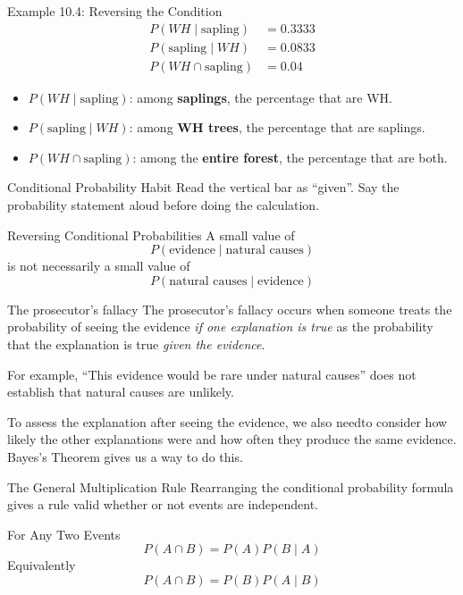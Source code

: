 \documentclass[aspectratio=169]{beamer}
\begin{document}
\begin{frame}{Example 10.4: Reversing the Condition}
\begin{align*}
	P(WH\mid\text{sapling}) &= 0.3333\\
	P(\text{sapling}\mid WH) &= 0.0833\\
	P(WH\cap\text{sapling}) &= 0.04
\end{align*}
\begin{itemize}
	\item $P(WH\mid\text{sapling})$: among \textbf{saplings}, the percentage that are WH.
	\item $P(\text{sapling}\mid WH)$: among \textbf{WH trees}, the percentage that are saplings.
    	\item $P(WH\cap\text{sapling})$: among the \textbf{entire forest}, the percentage that are both.
\end{itemize}
\begin{block}{Conditional Probability Habit}
Read the vertical bar as ``given''. Say the probability statement aloud before doing the calculation.
\end{block}
\end{frame}

\begin{frame}{Reversing Conditional Probabilities}
A small value of
\[
P(\text{evidence}\mid\text{natural causes})
\]
is not necessarily a small value of
\[
P(\text{natural causes}\mid\text{evidence})
\]

\begin{alertblock}{The prosecutor's fallacy}
The prosecutor's fallacy occurs when someone treats the probability of seeing the evidence \emph{if one explanation is true} as the probability that the explanation is true \emph{given the evidence}.

For example, ``This evidence would be rare under natural causes'' does not establish that natural causes are unlikely.
\end{alertblock}

To assess the explanation after seeing the evidence, we also needto consider how likely the other explanations were and how often they produce the same evidence. Bayes's Theorem gives us a way to do this.
\end{frame}

\begin{frame}{The General Multiplication Rule}
Rearranging the conditional probability formula gives a rule valid whether or not events are independent.
\begin{block}{For Any Two Events}
$$P(A\cap B)=P(A)P(B\mid A)$$
Equivalently
$$P(A\cap B)=P(B)P(A\mid B)$$
\end{block}
\end{frame}
\end{document}
